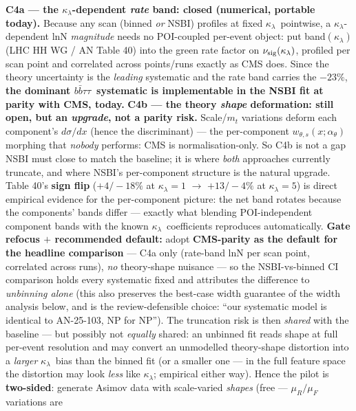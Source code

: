 \documentclass[11pt]{article}
\newcommand{\kl}{\ensuremath{\kappa_\lambda}}
\newcommand{\bbtt}{\ensuremath{b\bar b\tau\tau}}
\begin{document}
\begin{takeaway}
\textbf{C4a --- the \kl-dependent \emph{rate} band: closed (numerical, portable today).} Because any scan
(binned \emph{or} NSBI) profiles at fixed \kl\ pointwise, a \kl-dependent lnN \emph{magnitude} needs no
POI-coupled per-event object: put band$(\kl)$ (LHC HH WG / AN Table 40) into the green rate factor on
$\nu_{\rm sig}(\kl)$, profiled per scan point and correlated across points/runs exactly as CMS does. Since the
theory uncertainty is the \emph{leading} systematic and the rate band carries the $-23\%$, \textbf{the dominant
\bbtt\ systematic is implementable in the NSBI fit at parity with CMS, today.}
\textbf{C4b --- the theory \emph{shape} deformation: still open, but an \emph{upgrade}, not a parity risk.}
Scale/$m_t$ variations deform each component's $d\sigma/dx$ (hence the discriminant) --- the per-component
$w_{\theta,s}(x;\alpha_\theta)$ morphing that \emph{nobody} performs: CMS is normalisation-only. So C4b is not a
gap NSBI must close to match the baseline; it is where \emph{both} approaches currently truncate, and where
NSBI's per-component structure is the natural upgrade. Table 40's \textbf{sign flip} ($+4/-18\%$ at $\kl{=}1$
$\to$ $+13/-4\%$ at $\kl{=}5$) is direct empirical evidence for the per-component picture: the net band rotates
because the components' bands differ --- exactly what blending POI-independent component bands with the known
\kl\ coefficients reproduces automatically. \textbf{Gate refocus $+$ recommended default:} adopt
\textbf{CMS-parity as the default for the headline comparison} --- C4a only (rate-band lnN per scan point,
correlated across runs), \emph{no} theory-shape nuisance --- so the NSBI-vs-binned CI comparison holds every
systematic fixed and attributes the difference to \emph{unbinning alone} (this also preserves the best-case
width guarantee of the width analysis below, and is the review-defensible choice: ``our systematic model is
identical to AN-25-103, NP for NP''). The truncation risk is then \emph{shared} with the baseline --- but
possibly not \emph{equally} shared: an unbinned fit reads shape at full per-event resolution and may convert an
unmodelled theory-shape distortion into a \emph{larger} \kl\ bias than the binned fit (or a smaller one --- in
the full feature space the distortion may look \emph{less} like \kl; empirical either way). Hence the pilot is
\textbf{two-sided}: generate Asimov data with scale-varied \emph{shapes} (free --- $\mu_R/\mu_F$ variations are

\end{takeaway}
\end{document}
